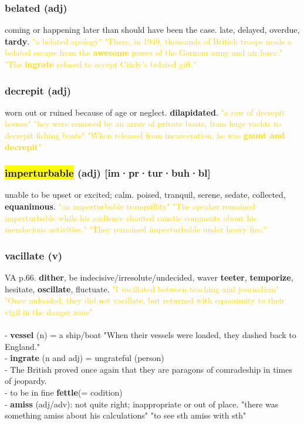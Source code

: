 \documentclass{proc}
\begin{document}
	\subsubsection{\textcolor{brickred}{belated} (adj)}
	coming or happening later than should have been the case. late, delayed, overdue, \textbf{tardy}.
	\textcolor{gold}{"a belated apology" "There, in 1940, thousands of British troops made a belated escape from the \textbf{awesome} power of the German army and air force." "The \textbf{ingrate} refused to accept Cindy's belated gift."}
	
	\subsubsection{\textcolor{brickred}{decrepit} (adj)}
	worn out or ruined because of age or neglect. \textbf{dilapidated}.
	\textcolor{gold}{"a row of decrepit houses" "hey were removed by an array of private boats, from huge yachts to decrepit fishing boats" "When released from incarceration, he was \textbf{gaunt and decrepit}"}
	
	\subsubsection{\textcolor{brickred}{\hl{imperturbable}} (adj) [im·pr·tur·buh·bl]}
	unable to be upset or excited; calm. poised,
	tranquil,
	serene,
	sedate,
	collected, \textbf{equanimous}.
	\textcolor{gold}{"an imperturbable tranquillity" "The speaker remained imperturbable while his audience shouted caustic comments about his mendacious activities." "They remained imperturbable under heavy fire."}
	
	\subsubsection{\textcolor{brickred}{vacillate} (v)}
	VA p.66. \textbf{dither},
	be indecisive/irresolute/undecided, waver
	\textbf{teeter},
	\textbf{temporize},
	hesitate,
	\textbf{oscillate},
	fluctuate.
	\textcolor{gold}{"I vacillated between teaching and journalism" "Once unloaded, they did not vacillate, but returned with equanimity to their vigil in the danger zone"}\\\\
	- \textbf{vessel} (n) = a ship/boat "When their vessels were loaded, they dashed back to England."\\
	- \textbf{ingrate} (n and adj) = ungrateful (person)\\
	- The British proved once again that they are paragons of comradeship in times of jeopardy.\\
	- to be in fine \textbf{fettle}(= codition)\\
	- \textbf{amiss} (adj/adv): not quite right; inappropriate or out of place.
	"there was something amiss about his calculations" "to see sth amiss with sth"
	
\end{document}
